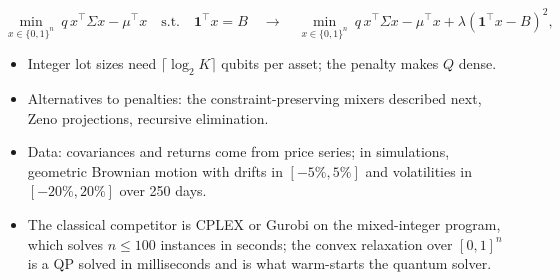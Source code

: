 \documentclass[handoutsbeamer.tex]{subfiles}
\begin{document}
\begin{frame}
\begin{equation}\label{eq:ch13:qubo}
    \min_{x\in\{0,1\}^n}\ q\,x^\top\Sigma x - \mu^\top x\quad\text{s.t.}\quad \boldsymbol1^\top x = B
    \quad\longrightarrow\quad
    \min_{x\in\{0,1\}^n}\ q\,x^\top\Sigma x - \mu^\top x + \lambda(\boldsymbol1^\top x - B)^2,
\end{equation}
\begin{itemize}\setlength\itemsep{0.2em}
    \item Integer lot sizes need $\lceil\log_2 K\rceil$ qubits per asset; the penalty makes $Q$ dense.
    \item Alternatives to penalties: the constraint-preserving mixers described next, Zeno projections, recursive elimination.
    \item Data: covariances and returns come from price series; in simulations, geometric Brownian motion with drifts in $[-5\%,5\%]$ and volatilities in $[-20\%,20\%]$ over 250 days.
    \item The classical competitor is CPLEX or Gurobi on the mixed-integer program, which solves $n \le 100$ instances in seconds; the convex relaxation over $[0,1]^n$ is a QP solved in milliseconds and is what warm-starts the quantum solver.
\end{itemize}
\end{frame}
\end{document}
